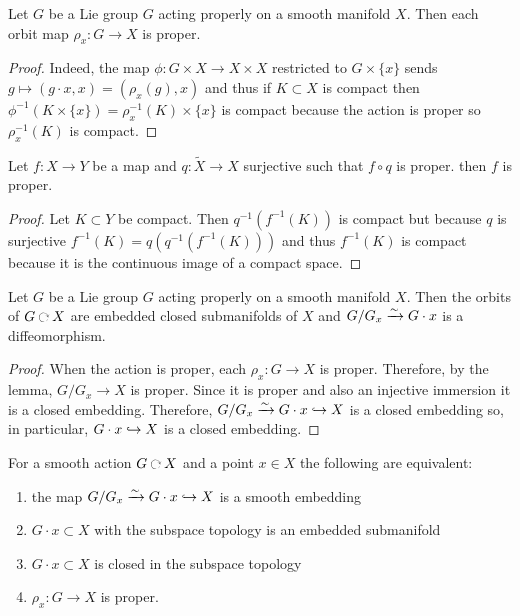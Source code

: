 \documentclass[12pt]{article}
\begin{document}
\begin{lemma}
Let $G$ be a Lie group $G$ acting properly on a smooth manifold $X$. Then each orbit map $\rho_x : G \to X$ is proper.
\end{lemma}

\begin{proof}
Indeed, the map $\phi : G \times X \to X \times X$ restricted to $G \times \{ x \}$ sends $g \mapsto (g \cdot x, x) = (\rho_x(g), x)$ and thus if $K \subset X$ is compact then $\phi^{-1}(K \times \{ x \}) = \rho_x^{-1}(K) \times \{ x \}$ is compact because the action is proper so $\rho_x^{-1}(K)$ is compact.
\end{proof}

\begin{lemma}
Let $f : X \to Y$ be a map and $q : \tilde{X} \to X$ surjective such that $f \circ q$ is proper. then $f$ is proper.
\end{lemma}

\begin{proof}
Let $K \subset Y$ be compact. Then $q^{-1}(f^{-1}(K))$ is compact but because $q$ is surjective $f^{-1}(K) = q(q^{-1}(f^{-1}(K)))$ and thus $f^{-1}(K)$ is compact because it is the continuous image of a compact space.
\end{proof}

\begin{proposition} \label{proper_action_orbits}
Let $G$ be a Lie group $G$ acting properly on a smooth manifold $X$. Then the orbits of $G \acts X$ are embedded closed submanifolds of $X$ and $G/G_x \xrightarrow{\sim} G \cdot x$ is a diffeomorphism.
\end{proposition}

\begin{proof}
When the action is proper, each $\rho_x : G \to X$ is proper. Therefore, by the lemma, $G / G_x \to X$ is proper. Since it is proper and also an injective immersion it is a closed embedding. Therefore, $G / G_x \xrightarrow{\sim} G \cdot x \hookrightarrow X$ is a closed embedding so, in particular, $G \cdot x \hookrightarrow X$ is a closed embedding.
\end{proof}

\begin{prop}
For a smooth action $G \acts X$ and a point $x \in X$ the following are equivalent:
\begin{enumerate}
\item the map $G/G_x \xrightarrow{\sim} G \cdot x \hookrightarrow X$ is a smooth embedding
\item $G \cdot x \subset X$ with the subspace topology is an embedded submanifold
\item $G \cdot x \subset X$ is closed in the subspace topology
\item $\rho_x : G \to X$ is proper.
\end{enumerate}
\end{prop}
\end{document}
